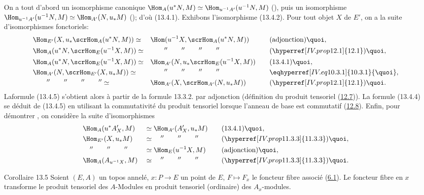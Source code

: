 \documentclass[10pt]{../fichiers-configuration-latex/smfart}
\begin{document}
On a tout d'abord un isomorphisme canonique
$\Hom_A(u^{\ast}N,M)\simeq \Hom_{u^{-1}A'}(u^{-1}N,M)$
(), puis un isomorphisme
$\Hom_{u^{-1}A'}(u^{-1}N,M)\simeq \Hom_{A'}(N,u_{\ast}M)$
(); d'où (13.4.1). Exhibons l'isomorphisme
(13.4.2). Pour tout objet $X$ de $E'$, on a la suite
d'isomorphismes fonctoriels:
\begin{alignat*}{3}
& \Hom_{E'}(X,u_{\ast}\scrHom_A (u^{\ast}N,M))\simeq && \Hom(
u^{-1}X,
 \scrHom_A (u^{\ast}N, M)) &\quad& \text{(adjonction){\quoi},}\\
&\Hom_A(u^{\ast}N,\scrHom_E (u^{-1}X, M)) \simeq &&\qquad ''\qquad ''\qquad
''\qquad '' && (\hyperref[IV.prop12.1]{12.1}){\quoi},\\
& \Hom_A (u^{\ast}N,\scrHom_E(u^{-1}X, M))\simeq &&\Hom_{A'}(N,
u_{\ast} \scrHom_E (u^{-1} X, M)) && (13.4.1){\quoi},\\
& \Hom_{A'}(N,\scrHom_{E'}(X,u_{\ast}M))\simeq &&\qquad ''\qquad  ''\qquad
 ''\qquad '' && \eqhyperref[IV.eq10.3.1]{10.3.1}{\quoi},\\
& \qquad ''\qquad ''\qquad ''\qquad '' \simeq &&
 \Hom_{A'}(X,\scrHom_{A'}(N,u_{\ast}M)) && (\hyperref[IV.prop12.1]{12.1}){\quoi}.
\end{alignat*}
La\pageoriginale formule (13.4.5) s'obtient alors à partir de
la formule 13.3.2. par adjonction (définition du produit tensoriel
(\hyperref[IV.prop12.7]{12.7})). La formule (13.4.4) se déduit de
(13.4.5) en utilisant la commutativité du produit tensoriel
lorsque l'anneau de base est commutatif (\hyperref[IV.subsec12.8]{12.8}).
Enfin, pour démontrer , on considère la suite
d'isomorphismes
\begin{alignat*}{3}
& \Hom_A(u^{\ast}A'_X, M) && \simeq\Hom_{A'}(A'_X, u_{\ast}M)
&\quad&
(13.4.1){\quoi},\\
& \Hom_{E'}(X, u_{\ast}M) && \simeq\quad ''\qquad ''\qquad ''&&
(\hyperref[IV.prop11.3.3]{11.3.3}){\quoi},\\
&\quad ''\qquad ''\qquad ''&& \simeq\Hom_E(u^{-1}X, M) &&
\text{(adjonction)}{\quoi},\\
&\Hom_A(A_{u^{-1}X},M) &&\simeq\quad ''\qquad ''\qquad ''&&
(\hyperref[IV.prop11.3.3]{11.3.3}){\quoi}.
\end{alignat*}

\begin{enonce*}{Corollaire 13.5}
Soient $(E,A)$ un topos annelé, $x:P\rightarrow E$ un point de $E$,
$F\mapsto F_x$ le foncteur fibre associé (\hyperref[IV.def6.1]{6.1}). Le
foncteur fibre en $x$ transforme le produit tensoriel des
$A$-Modules en produit tensoriel (ordinaire) des $A_x$-modules.
\end{enonce*}
\end{document}
